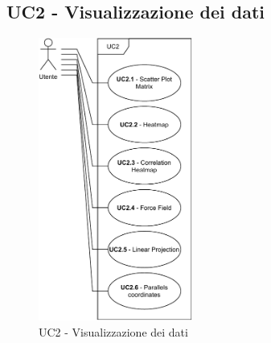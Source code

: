 \subsection{UC2 - Visualizzazione dei dati}
\label{uc2}

    \begin{figure}[htbp]
        \centering
        \includegraphics[width=0.45\textwidth]{source/sections/casi-uso/diagrams/uc2.pdf}
        \caption{UC2 - Visualizzazione dei dati}
        \label{fig:uc2}
    \end{figure}

